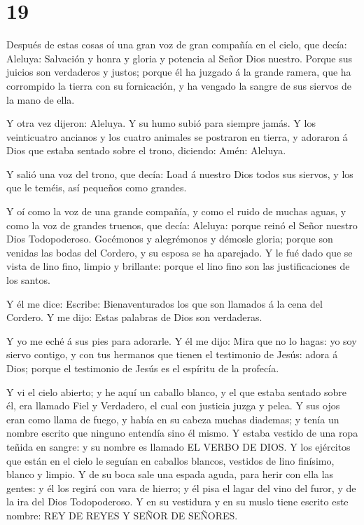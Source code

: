 \hypertarget{section-18}{%
\section{19}\label{section-18}}

 Después de estas cosas oí una gran voz de gran compañía en
el cielo, que decía: Aleluya: Salvación y honra y gloria y potencia al
Señor Dios nuestro.  Porque sus juicios son verdaderos y
justos; porque él ha juzgado á la grande ramera, que ha corrompido la
tierra con su fornicación, y ha vengado la sangre de sus siervos de la
mano de ella.

 Y otra vez dijeron: Aleluya. Y su humo subió para siempre
jamás.  Y los veinticuatro ancianos y los cuatro animales se
postraron en tierra, y adoraron á Dios que estaba sentado sobre el
trono, diciendo: Amén: Aleluya.

 Y salió una voz del trono, que decía: Load á nuestro Dios
todos sus siervos, y los que le teméis, así pequeños como grandes.

 Y oí como la voz de una grande compañía, y como el ruido de
muchas aguas, y como la voz de grandes truenos, que decía: Aleluya:
porque reinó el Señor nuestro Dios Todopoderoso.  Gocémonos
y alegrémonos y démosle gloria; porque son venidas las bodas del
Cordero, y su esposa se ha aparejado.  Y le fué dado que se
vista de lino fino, limpio y brillante: porque el lino fino son las
justificaciones de los santos.

 Y él me dice: Escribe: Bienaventurados los que son llamados
á la cena del Cordero. Y me dijo: Estas palabras de Dios son verdaderas.

 Y yo me eché á sus pies para adorarle. Y él me dijo: Mira
que no lo hagas: yo soy siervo contigo, y con tus hermanos que tienen el
testimonio de Jesús: adora á Dios; porque el testimonio de Jesús es el
espíritu de la profecía.

 Y vi el cielo abierto; y he aquí un caballo blanco, y el
que estaba sentado sobre él, era llamado Fiel y Verdadero, el cual con
justicia juzga y pelea.  Y sus ojos eran como llama de
fuego, y había en su cabeza muchas diademas; y tenía un nombre escrito
que ninguno entendía sino él mismo.  Y estaba vestido de
una ropa teñida en sangre: y su nombre es llamado EL VERBO DE DIOS.
 Y los ejércitos que están en el cielo le seguían en
caballos blancos, vestidos de lino finísimo, blanco y limpio.
 Y de su boca sale una espada aguda, para herir con ella
las gentes: y él los regirá con vara de hierro; y él pisa el lagar del
vino del furor, y de la ira del Dios Todopoderoso.  Y en su
vestidura y en su muslo tiene escrito este nombre: REY DE REYES Y SEÑOR
DE SEÑORES.

